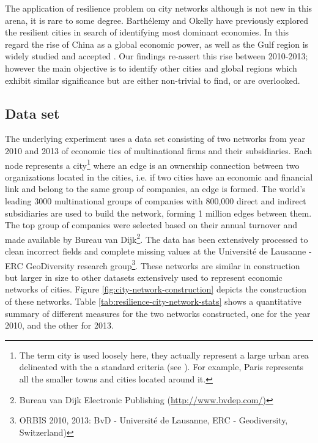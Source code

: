 	The application of resilience problem on city networks although is not new in this arena, it is rare to some degree. Barthélemy \cite{barthelemy2011} and Okelly \cite{okelly2014} have previously explored the resilient cities in search of identifying most dominant economies. In this regard the rise of China as a global economic power, as well as the Gulf region is widely studied and accepted \cite{alderson2010,mahutga2010,derudder2010}. Our findings re-assert this rise between 2010-2013; however the main objective is to identify other cities and global regions which exhibit similar significance but are either non-trivial to find, or are overlooked.
	
		\subsection{Data set}
		The underlying experiment uses a data set consisting of two networks from year 2010 and 2013 of economic ties of multinational firms and their subsidiaries. Each node represents a city\footnote{The term city is used loosely here, they actually represent a large urban area delineated with the a standard criteria (see \cite{rozenblat2017}). For example, Paris represents all the smaller towns and cities located around it.} where an edge is an ownership connection between two organizations located in the cities, i.e. if two cities have an economic and financial link and belong to the same group of companies, an edge is formed. The world's leading 3000 multinational groups of companies with 800,000 direct and indirect subsidiaries are used to build the network, forming 1 million edges between them. The top group of companies were selected based on their annual turnover and made available by Bureau van Dijk\footnote{Bureau van Dijk Electronic Publishing (\url{http://www.bvdep.com/)}}.
		The data has been extensively processed to clean incorrect fields and complete missing values at the Universit\'{e} de Lausanne - ERC GeoDiversity research group\footnote{ORBIS 2010, 2013: BvD - Universit\'{e} de Lausanne, ERC - Geodiversity, Switzerland)}. These networks are similar in construction but larger in size to other datasets \cite{kraetke2014,wall2011,alderson2004} extensively used to represent economic networks of cities. Figure \ref{fig:city-network-construction} depicts the construction of these networks. Table \ref{tab:resilience-city-network-stats} shows a quantitative summary of different measures for the two networks constructed, one for the year 2010, and the other for 2013.
		
